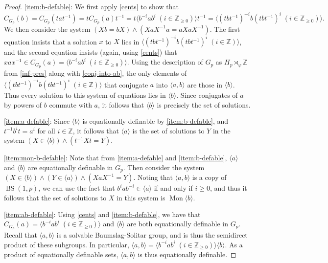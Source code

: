 \documentclass[10pt,a4paper]{amsart}
\DeclareMathOperator{\BS}{BS}
\DeclareMathOperator{\Mon}{Mon}
\newcommand{\Z}{\mathbb{Z}}
\begin{document}
\begin{proof}
 	\eqref{item:b-defable}: We first apply \cref{cents} to show that
	\[
			C_{G_p}(b) = C_{G_p}(tat^{-1}) = t C_{G_p}(a) t^{-1}
			= t \langle b^{-i} a b^i \; (i \in \Z_{\geq 0}) \rangle t^{-1}
					= \langle  (tbt^{-1})^{-i} b (tbt^{-1})^i \; (i \in \Z_{\geq 0}) \rangle.
	\]
	We then consider the system \((Xb = bX) \wedge (XaX^{-1} a = a XaX^{-1})\).
	The first equation insists that a solution \(x\) to \(X\) lies in \(\langle
	(tbt^{-1})^{-i} b (tbt^{-1})^i \; (i \in \Z)\rangle\), and the second
	equation insists (again, using \cref{cents}) that \(xax^{-1} \in C_{G_p}(a)
	=  \langle b^{-i} a b^i \; (i \in \Z_{\geq 0}) \rangle\). Using the
	description of \(G_p\) as \(H_p \rtimes_\varphi \Z\) from
	\cref{inf-pres}
	along with
	\cref{conj-into-ab}, the only elements of \(\langle (tbt^{-1})^{-i} b (tbt^{-1})^i \;
	(i \in \Z)\rangle\) that conjugate \(a\) into \(\langle a, b \rangle\) are
	those in \(\langle b \rangle\). Thus every solution to this system of
	equations lies in \(\langle b \rangle\).  Since conjugates of \(a\) by
	powers of \(b\) commute with \(a\), it follows that \(\langle b \rangle\)
	is precisely the set of solutions.

	\eqref{item:a-defable}: Since \(\langle b \rangle\) is equationally
	definable by \eqref{item:b-defable}, and \(t^{-1} b^i t = a^i\) for all \(i
	\in \Z\), it follows that \(\langle a \rangle\) is the set of solutions to
	\(Y\) in the system \((X \in \langle b \rangle) \wedge (t^{-1} X t = Y)\).

	\eqref{item:mon-b-defable}: Note that from \eqref{item:a-defable} and
	\eqref{item:b-defable}, \(\langle a \rangle\) and \(\langle b \rangle\) are
	equationally definable in \(G_p\). Then consider the system \((X \in
	\langle b \rangle) \wedge (Y \in \langle a \rangle) \wedge (X aX^{-1} =
	Y)\). Noting that \(\langle a, b \rangle\) is a copy of \(\BS(1, p)\), we
	can use the fact that \(b^i a b^{-i} \in \langle a \rangle\) if and only if
	\(i \geq 0\), and thus it follows that the set of solutions to \(X\) in
	this system is \(\Mon\langle b \rangle\).

	\eqref{item:ab-defable}: Using \cref{cents} and \eqref{item:b-defable}, 
	we have that \(C_{G_p}(a) = \langle b^{-i} a b^i \; (i \in \Z_{\geq 0}) \rangle\)
	and \(\langle b \rangle\) are both equationally definable in \(G_p\).
	Recall that \(\langle a, b \rangle\) is a solvable Baumslag-Solitar group,
	and is thus the semidirect product of these subgroups. In particular,
	\(\langle a, b \rangle = \langle b^{-i} a b^i \; (i \in \Z_{\geq 0}) \rangle
	\langle b \rangle\). As a product of equationally definable sets,
	\(\langle a, b \rangle\) is thus equationally definable.


\end{proof}
\end{document}
